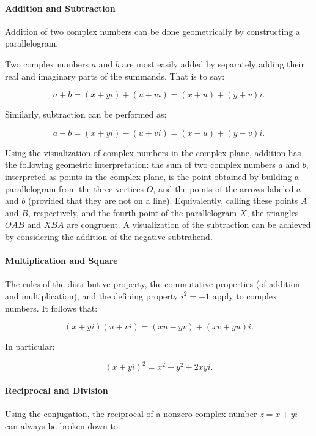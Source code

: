 \paragraph{Addition and Subtraction}

Addition of two complex numbers can be done geometrically by constructing a parallelogram. 


Two complex numbers $a$ and $b$ are most easily added by separately adding their real and imaginary parts of the summands. That is to say:

$$a + b = (x + yi) + (u + vi) = (x + u) + (y + v)i.$$

Similarly, subtraction can be performed as:

$$a - b = (x + yi) - (u + vi) = (x - u) + (y - v)i.$$

Using the visualization of complex numbers in the complex plane, addition has the following geometric interpretation: the sum of two complex numbers $a$ and $b$, interpreted as points in the complex plane, is the point obtained by building a parallelogram from the three vertices $O$, and the points of the arrows labeled $a$ and $b$ (provided that they are not on a line). Equivalently, calling these points $A$ and $B$, respectively, and the fourth point of the parallelogram $X$, the triangles $OAB$ and $XBA$ are congruent. A visualization of the subtraction can be achieved by considering the addition of the negative subtrahend.

\paragraph{Multiplication and Square}

The rules of the distributive property, the commutative properties (of addition and multiplication), and the defining property $i^2 = -1$ apply to complex numbers. It follows that:

$$(x + yi)(u + vi) = (xu - yv) + (xv + yu)i.$$

In particular:

$$(x + yi)^2 = x^2 - y^2 + 2xyi.$$

\paragraph{Reciprocal and Division}

Using the conjugation, the reciprocal of a nonzero complex number $z = x + yi$ can always be broken down to:

